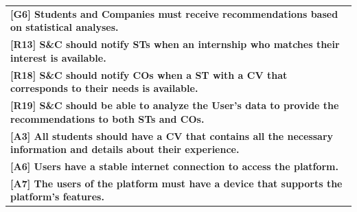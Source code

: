 \begin{center}
    \begin{tabular}{|p{37em}|}
        \rowcolor{bluepoli!40} %
        \hline
        \textbf{[G6] Students and Companies must receive recommendations based on statistical analyses.} \\
        \rowcolor{bluepoli!15}
        \textbf{[R13] S\&C should notify STs when an internship who matches their interest is available.} \\
        \rowcolor{bluepoli!15}
        \textbf{[R18] S\&C should notify COs when a ST with a CV that corresponds to their needs is available.} \\
        \rowcolor{bluepoli!15}
        \textbf{[R19] S\&C should be able to analyze the User’s data to provide the recommendations to both STs and COs.} \\
        \textbf{[A3] All students should have a CV that contains all the necessary information and details about their experience.} \\
        \textbf{[A6] Users have a stable internet connection to access the platform.}\\
        \textbf{[A7] The users of the platform must have a device that supports the platform's features.}\\
        \hline
    \end{tabular}
\end{center}

